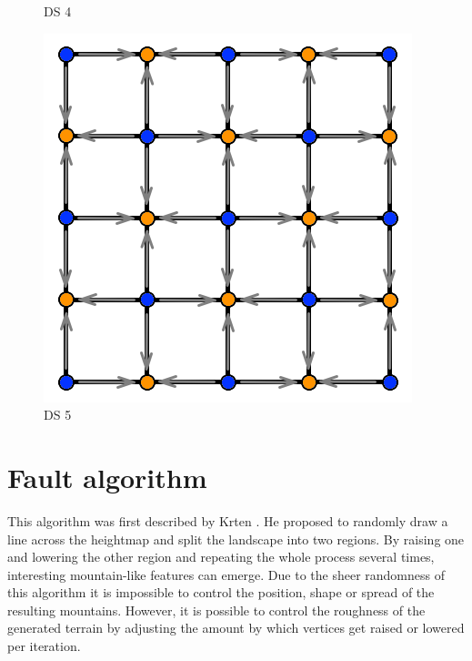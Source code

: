 \documentclass[11pt,a4paper,twoside,openright]{report}
\begin{document}
\begin{figure}[!htb]
  \caption{DS 4}\label{fig:ds4}
\endminipage\hfill
{}%
  \includegraphics[width=\linewidth]{ds5.png}
  \caption{DS 5}\label{fig:ds5}
\endminipage
\end{figure}

\section{Fault algorithm}
This algorithm was first described by Krten \cite{Krten:1994}. He proposed to randomly draw a line across the heightmap and split the landscape into two regions. By raising one and lowering the other region and repeating the whole process several times, interesting mountain-like features can emerge. Due to the sheer randomness of this algorithm it is impossible to control the position, shape or spread of the resulting mountains. However, it is possible to control the roughness of the generated terrain by adjusting the amount by which vertices get raised or lowered per iteration.
\end{document}

